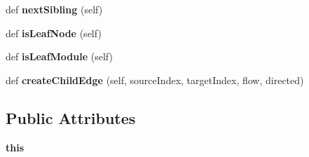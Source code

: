 \begin{DoxyCompactItemize}
\mbox{\label{classdsmacc_1_1graph_1_1infomap_1_1infomap_1_1TreeIterator_aceda06eb0b67b0bdb6812c7256e03a6a}} 
def {\bfseries next\+Sibling} (self)
\item 
\mbox{\label{classdsmacc_1_1graph_1_1infomap_1_1infomap_1_1TreeIterator_af91c744530909e99739ba90476da224a}} 
def {\bfseries is\+Leaf\+Node} (self)
\item 
\mbox{\label{classdsmacc_1_1graph_1_1infomap_1_1infomap_1_1TreeIterator_a6a5facdd7f73d108d8d9ee8790b842d7}} 
def {\bfseries is\+Leaf\+Module} (self)
\item 
\mbox{\label{classdsmacc_1_1graph_1_1infomap_1_1infomap_1_1TreeIterator_ae307592de43294ac1466a08c0f237214}} 
def {\bfseries create\+Child\+Edge} (self, source\+Index, target\+Index, flow, directed)
\end{DoxyCompactItemize}
\subsection*{Public Attributes}
\begin{DoxyCompactItemize}
\item 
\mbox{\label{classdsmacc_1_1graph_1_1infomap_1_1infomap_1_1TreeIterator_a7f02d33dd668fccf50f20fe6cd09741f}} 
{\bfseries this}
\end{DoxyCompactItemize}
